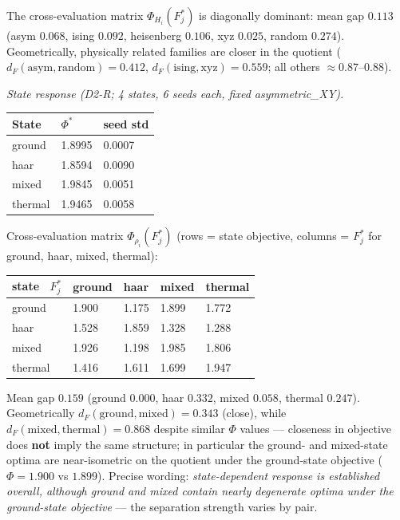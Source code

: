 \documentclass[
]{article}
\begin{document}
The cross-evaluation matrix \(\Phi_{H_i}(F^*_j)\) is diagonally
dominant: mean gap \(0.113\) (asym \(0.068\), ising \(0.092\),
heisenberg \(0.106\), xyz \(0.025\), random \(0.274\)). Geometrically,
physically related families are closer in the quotient
(\(d_F(\mathrm{asym},\mathrm{random}) = 0.412\),
\(d_F(\mathrm{ising},\mathrm{xyz}) = 0.559\); all others \(\approx
0.87\text{–}0.88\)).

\emph{State response (D2-R; 4 states, 6 seeds each, fixed
asymmetric\_XY).}

{\def\LTcaptype{none} %
\begin{longtable}[]{@{}lll@{}}
\toprule\noalign{}
State & \(\Phi^*\) & seed std \\
\midrule\noalign{}
\endhead
\bottomrule\noalign{}
\endlastfoot
ground & 1.8995 & 0.0007 \\
haar & 1.8594 & 0.0090 \\
mixed & 1.9845 & 0.0051 \\
thermal & 1.9465 & 0.0058 \\
\end{longtable}
}

Cross-evaluation matrix \(\Phi_{\rho_i}(F^*_j)\) (rows = state
objective, columns = \(F^*_j\) for ground, haar, mixed, thermal):

{\def\LTcaptype{none} %
\begin{longtable}[]{@{}lllll@{}}
\toprule\noalign{}
state ~\(F^*_j\) & ground & haar & mixed & thermal \\
\midrule\noalign{}
\endhead
\bottomrule\noalign{}
\endlastfoot
ground & 1.900 & 1.175 & 1.899 & 1.772 \\
haar & 1.528 & 1.859 & 1.328 & 1.288 \\
mixed & 1.926 & 1.198 & 1.985 & 1.806 \\
thermal & 1.416 & 1.611 & 1.699 & 1.947 \\
\end{longtable}
}

Mean gap \(0.159\) (ground \(0.000\), haar \(0.332\), mixed \(0.058\),
thermal \(0.247\)). Geometrically
\(d_F(\mathrm{ground},\mathrm{mixed}) = 0.343\) (close), while
\(d_F(\mathrm{mixed},\mathrm{thermal}) = 0.868\) despite similar
\(\Phi\) values --- closeness in objective does \textbf{not} imply the
same structure; in particular the ground- and mixed-state optima are
near-isometric on the quotient under the ground-state objective
(\(\Phi = 1.900\) vs \(1.899\)). Precise wording: \emph{state-dependent
response is established overall, although ground and mixed contain
nearly degenerate optima under the ground-state objective} --- the
separation strength varies by pair.
\end{document}
